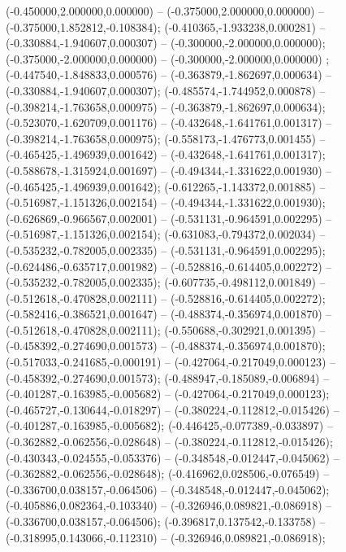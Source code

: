  (-0.450000,2.000000,0.000000) -- (-0.375000,2.000000,0.000000) -- (-0.375000,1.852812,-0.108384);
 (-0.410365,-1.933238,0.000281) -- (-0.330884,-1.940607,0.000307) -- (-0.300000,-2.000000,0.000000);
 (-0.375000,-2.000000,0.000000) -- (-0.300000,-2.000000,0.000000) ;
 (-0.447540,-1.848833,0.000576) -- (-0.363879,-1.862697,0.000634) -- (-0.330884,-1.940607,0.000307);
 (-0.485574,-1.744952,0.000878) -- (-0.398214,-1.763658,0.000975) -- (-0.363879,-1.862697,0.000634);
 (-0.523070,-1.620709,0.001176) -- (-0.432648,-1.641761,0.001317) -- (-0.398214,-1.763658,0.000975);
 (-0.558173,-1.476773,0.001455) -- (-0.465425,-1.496939,0.001642) -- (-0.432648,-1.641761,0.001317);
 (-0.588678,-1.315924,0.001697) -- (-0.494344,-1.331622,0.001930) -- (-0.465425,-1.496939,0.001642);
 (-0.612265,-1.143372,0.001885) -- (-0.516987,-1.151326,0.002154) -- (-0.494344,-1.331622,0.001930);
 (-0.626869,-0.966567,0.002001) -- (-0.531131,-0.964591,0.002295) -- (-0.516987,-1.151326,0.002154);
 (-0.631083,-0.794372,0.002034) -- (-0.535232,-0.782005,0.002335) -- (-0.531131,-0.964591,0.002295);
 (-0.624486,-0.635717,0.001982) -- (-0.528816,-0.614405,0.002272) -- (-0.535232,-0.782005,0.002335);
 (-0.607735,-0.498112,0.001849) -- (-0.512618,-0.470828,0.002111) -- (-0.528816,-0.614405,0.002272);
 (-0.582416,-0.386521,0.001647) -- (-0.488374,-0.356974,0.001870) -- (-0.512618,-0.470828,0.002111);
 (-0.550688,-0.302921,0.001395) -- (-0.458392,-0.274690,0.001573) -- (-0.488374,-0.356974,0.001870);
 (-0.517033,-0.241685,-0.000191) -- (-0.427064,-0.217049,0.000123) -- (-0.458392,-0.274690,0.001573);
 (-0.488947,-0.185089,-0.006894) -- (-0.401287,-0.163985,-0.005682) -- (-0.427064,-0.217049,0.000123);
 (-0.465727,-0.130644,-0.018297) -- (-0.380224,-0.112812,-0.015426) -- (-0.401287,-0.163985,-0.005682);
 (-0.446425,-0.077389,-0.033897) -- (-0.362882,-0.062556,-0.028648) -- (-0.380224,-0.112812,-0.015426);
 (-0.430343,-0.024555,-0.053376) -- (-0.348548,-0.012447,-0.045062) -- (-0.362882,-0.062556,-0.028648);
 (-0.416962,0.028506,-0.076549) -- (-0.336700,0.038157,-0.064506) -- (-0.348548,-0.012447,-0.045062);
 (-0.405886,0.082364,-0.103340) -- (-0.326946,0.089821,-0.086918) -- (-0.336700,0.038157,-0.064506);
 (-0.396817,0.137542,-0.133758) -- (-0.318995,0.143066,-0.112310) -- (-0.326946,0.089821,-0.086918);
